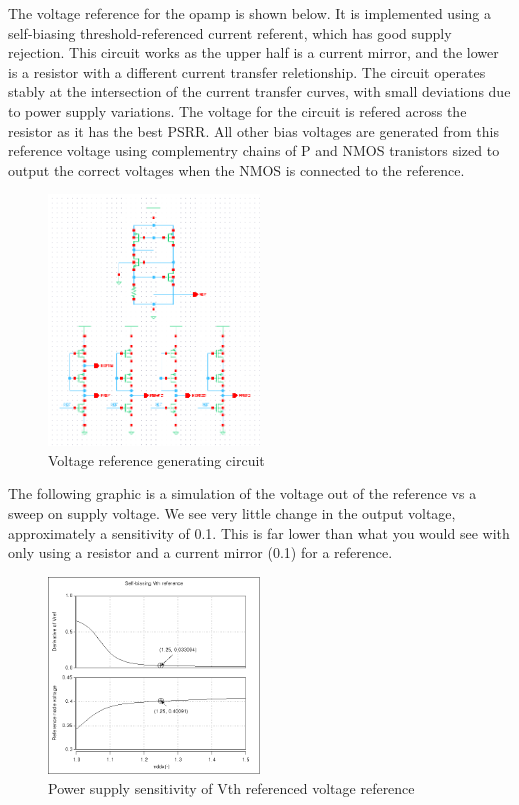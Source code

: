 \documentclass[conference]{IEEEtran}
\begin{document}
The voltage reference for the opamp is shown below. It is implemented using a self-biasing threshold-referenced current referent, which has good supply rejection. This circuit works as the upper half is a current mirror, and the lower is a resistor with a different current transfer reletionship. The circuit operates stably at the intersection of the current transfer curves, with small deviations due to power supply variations. The voltage for the circuit is refered across the resistor as it has the best PSRR. All other bias voltages are generated from this reference voltage using complementry chains of P and NMOS tranistors sized to output the correct voltages when the NMOS is connected to the reference.
\FloatBarrier
\begin{figure}[htb]
\centering
\includegraphics[width=0.5\textwidth]{refs.png}
\caption{Voltage reference generating circuit}
\label{folded}
\end{figure}
\FloatBarrier
The following graphic is a simulation of the voltage out of the reference vs a sweep on supply voltage. We see very little change in the output voltage, approximately a sensitivity of 0.1. This is far lower than what you would see with only using a resistor and a current mirror (0.1) for a reference.

\FloatBarrier
\begin{figure}[htb]
\centering
\includegraphics[width=0.5\textwidth]{reference.png}
\caption{Power supply sensitivity of Vth referenced voltage reference}
\label{folded}
\end{figure}
\FloatBarrier
\end{document}
